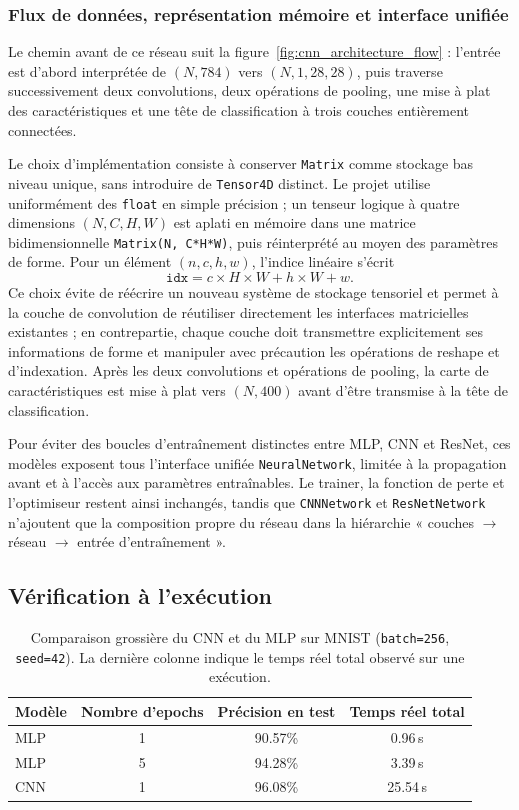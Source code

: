 \documentclass[a4paper,11pt,oneside]{article}
\begin{document}
\subsubsection{Flux de données, représentation mémoire et interface unifiée}

Le chemin avant de ce réseau suit la figure~\ref{fig:cnn_architecture_flow} : l'entrée est d'abord interprétée de $(N,784)$ vers $(N,1,28,28)$, puis traverse successivement deux convolutions, deux opérations de pooling, une mise à plat des caractéristiques et une tête de classification à trois couches entièrement connectées.

Le choix d'implémentation consiste à conserver \texttt{Matrix} comme stockage bas niveau unique, sans introduire de \texttt{Tensor4D} distinct. Le projet utilise uniformément des \texttt{float} en simple précision ; un tenseur logique à quatre dimensions $(N,C,H,W)$ est aplati en mémoire dans une matrice bidimensionnelle \texttt{Matrix(N, C*H*W)}, puis réinterprété au moyen des paramètres de forme. Pour un élément $(n,c,h,w)$, l'indice linéaire s'écrit
\[
\texttt{idx} = c \times H \times W + h \times W + w.
\]
Ce choix évite de réécrire un nouveau système de stockage tensoriel et permet à la couche de convolution de réutiliser directement les interfaces matricielles existantes ; en contrepartie, chaque couche doit transmettre explicitement ses informations de forme et manipuler avec précaution les opérations de reshape et d'indexation. Après les deux convolutions et opérations de pooling, la carte de caractéristiques est mise à plat vers $(N,400)$ avant d'être transmise à la tête de classification.

Pour éviter des boucles d'entraînement distinctes entre MLP, CNN et ResNet, ces modèles exposent tous l'interface unifiée \texttt{NeuralNetwork}, limitée à la propagation avant et à l'accès aux paramètres entraînables. Le trainer, la fonction de perte et l'optimiseur restent ainsi inchangés, tandis que \texttt{CNNNetwork} et \texttt{ResNetNetwork} n'ajoutent que la composition propre du réseau dans la hiérarchie « couches $\rightarrow$ réseau $\rightarrow$ entrée d'entraînement ».

\subsection{Vérification à l'exécution}

\begin{table}[h]
\centering
\begin{tabular}{lccc}
\hline
Modèle & Nombre d'epochs & Précision en test & Temps réel total \\
\hline
MLP & 1 & 90.57\% & 0.96\,s \\
MLP & 5 & 94.28\% & 3.39\,s \\
CNN & 1 & 96.08\% & 25.54\,s \\
\hline
\end{tabular}
\caption{Comparaison grossière du CNN et du MLP sur MNIST (\texttt{batch=256}, \texttt{seed=42}). La dernière colonne indique le temps réel total observé sur une exécution.}
\label{tab:cnn_mlp_acc}
\end{table}
\end{document}
